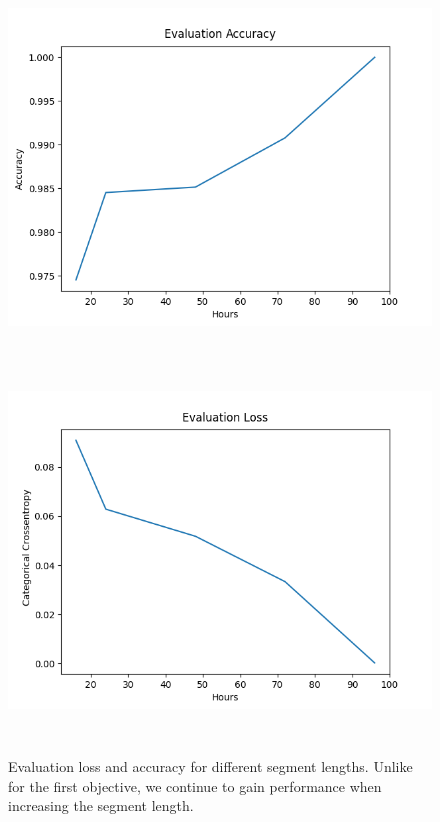 \begin{figure}[!ht]
      \centering
      \includegraphics[height=10cm]{img/depression_class/plot_acc_eval.png}
      \includegraphics[height=10cm]{img/depression_class/plot_loss_eval.png}
      \caption{Evaluation loss and accuracy for different segment lengths. Unlike for the first objective, we continue to gain performance when increasing the segment length.}
      \label{figure:depression_class_50e_eval}
\end{figure}

